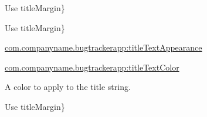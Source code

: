 
\begin{DoxyRefList}
\end{DoxyRefList}

\label{deprecated__deprecated000001}%
%
Use title\+Margin\} 

\label{deprecated__deprecated000002}%
%
Use title\+Margin\} 

{\ttfamily \mbox{\hyperlink{}{com.\+companyname.\+bugtrackerapp\+:title\+Text\+Appearance}}}

{\ttfamily \mbox{\hyperlink{}{com.\+companyname.\+bugtrackerapp\+:title\+Text\+Color}}}

A color to apply to the title string. 

\label{deprecated__deprecated000003}%
%
Use title\+Margin\}